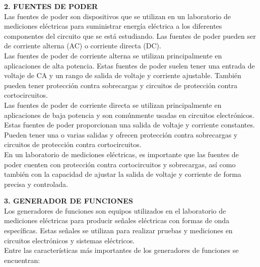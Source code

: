 \documentclass[12pt]{article}
\begin{document}
	\textbf{2. FUENTES DE PODER}\\
	
	Las fuentes de poder son dispositivos que se utilizan en un laboratorio de mediciones eléctricas para suministrar energía eléctrica a los diferentes componentes del circuito que se está estudiando. Las fuentes de poder pueden ser de corriente alterna (AC) o corriente directa (DC).\\
	
	Las fuentes de poder de corriente alterna se utilizan principalmente en aplicaciones de alta potencia. Estas fuentes de poder suelen tener una entrada de voltaje de CA y un rango de salida de voltaje y corriente ajustable. También pueden tener protección contra sobrecargas y circuitos de protección contra cortocircuitos.\\
	
	Las fuentes de poder de corriente directa se utilizan principalmente en aplicaciones de baja potencia y son comúnmente usadas en circuitos electrónicos. Estas fuentes de poder proporcionan una salida de voltaje y corriente constantes. Pueden tener una o varias salidas y ofrecen protección contra sobrecargas y circuitos de protección contra cortocircuitos.\\
	
	En un laboratorio de mediciones eléctricas, es importante que las fuentes de poder cuenten con protección contra cortocircuitos y sobrecargas, así como también con la capacidad de ajustar la salida de voltaje y corriente de forma precisa y controlada.\\
	
	\newpage
	
	\textbf{3. GENERADOR DE FUNCIONES}\\
	
	Los generadores de funciones son equipos utilizados en el laboratorio de mediciones eléctricas para producir señales eléctricas con formas de onda específicas. Estas señales se utilizan para realizar pruebas y mediciones en circuitos electrónicos y sistemas eléctricos.\\
	
	Entre las características más importantes de los generadores de funciones se encuentran:\\
	
\end{document}
